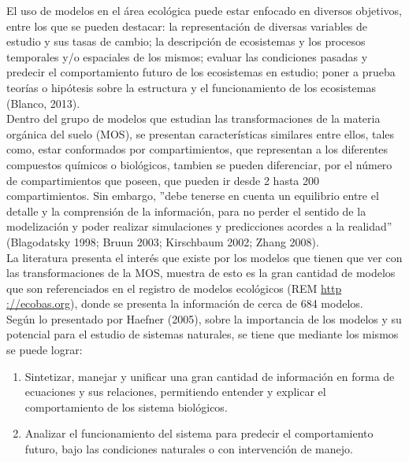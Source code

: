 El uso de modelos en el \'area ecol\'ogica puede estar enfocado en diversos objetivos, entre los que se pueden destacar: la representaci\'on de diversas variables de estudio y sus tasas de cambio; la descripci\'on de ecosistemas y los procesos temporales y/o espaciales de los mismos; evaluar las condiciones pasadas y predecir el comportamiento futuro de los ecosistemas en estudio; poner a prueba teor\'ias o hip\'otesis sobre la estructura y el funcionamiento de los ecosistemas (Blanco, 2013).\\

Dentro del grupo de modelos que estudian las transformaciones de la materia org\'anica del suelo (MOS), se presentan caracter\'isticas similares entre ellos, tales como, estar conformados por compartimientos, que representan a los diferentes compuestos qu\'imicos o biol\'ogicos, tambien  se pueden diferenciar, por el n\'umero de compartimientos que poseen, que pueden ir desde 2 hasta 200 compartimientos. Sin embargo, ''debe tenerse en cuenta un equilibrio entre el detalle y la comprensi\'on de la informaci\'on, para no perder el sentido de la modelizaci\'on y poder realizar simulaciones y predicciones acordes a la realidad'' (Blagodatsky 1998; Bruun 2003; Kirschbaum 2002;  Zhang 2008).\\


La literatura presenta el inter\'es que existe por los modelos que tienen que ver con las transformaciones de la MOS, muestra de esto es la gran cantidad de modelos que son referenciados en el registro de modelos ecol\'ogicos (REM \url{http ://ecobas.org}), donde se presenta la informaci\'on de cerca de 684 modelos.\\

Seg\'un lo presentado por Haefner (2005), sobre la importancia de los modelos y su potencial para el estudio de sistemas naturales, se tiene que mediante los mismos se puede lograr:\\


\begin{enumerate}
  \item Sintetizar, manejar y unificar una gran cantidad de informaci\'on en forma de ecuaciones y sus relaciones, permitiendo entender y explicar el comportamiento de los sistema biol\'ogicos.
 \item Analizar el funcionamiento del sistema para predecir el comportamiento futuro, bajo las condiciones naturales o con intervenci\'on de manejo.
\end{enumerate}

